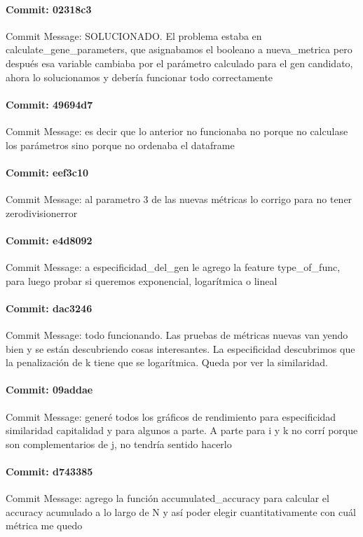 \documentclass{article}
\begin{document}
\paragraph{Commit: 02318c3}
Commit Message: SOLUCIONADO. El problema estaba en calculate_gene_parameters, que asignabamos el booleano a nueva_metrica pero después esa variable cambiaba por el parámetro calculado para el gen candidato, ahora lo solucionamos y debería funcionar todo correctamente

\paragraph{Commit: 49694d7}
Commit Message: es decir que lo anterior no funcionaba no porque no calculase los parámetros sino porque no ordenaba el dataframe

\paragraph{Commit: eef3c10}
Commit Message: al parametro 3 de las nuevas métricas lo corrigo para no tener zerodivisionerror

\paragraph{Commit: e4d8092}
Commit Message: a especificidad_del_gen le agrego la feature type_of_func, para luego probar si queremos exponencial, logarítmica o lineal

\paragraph{Commit: dac3246}
Commit Message: todo funcionando. Las pruebas de métricas nuevas van yendo bien y se están descubriendo cosas interesantes. La especificidad descubrimos que la penalización de k tiene que se logarítmica. Queda por ver la similaridad.

\paragraph{Commit: 09addae}
Commit Message: generé todos los gráficos de rendimiento para especificidad similaridad capitalidad y para algunos a parte. A parte para i y k no corrí porque son complementarios de j, no tendría sentido hacerlo

\paragraph{Commit: d743385}
Commit Message: agrego la función accumulated_accuracy para calcular el accuracy acumulado a lo largo de N y así poder elegir cuantitativamente con cuál métrica me quedo
\end{document}
